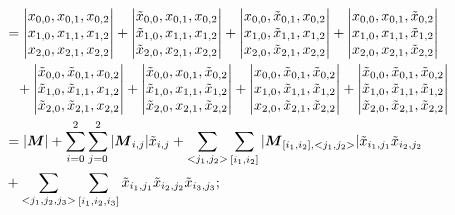 \documentclass[twoside]{article}
\numberwithin{equation}{section}
\newcommand{\eqspace}{\;\;\;}
\begin{document}
\begin{align*}
 &= \left| \begin{matrix} 
        	x_{0,0}, x_{0,1}, x_{0,2} \\ 
			x_{1,0}, x_{1,1}, x_{1,2} \\ 
			x_{2,0}, x_{2,1}, x_{2,2} \end{matrix} \right|
	  + \left| \begin{matrix} 
	  		\tilde{x}_{0,0}, x_{0,1}, x_{0,2} \\ 
			\tilde{x}_{1,0}, x_{1,1}, x_{1,2} \\ 
			\tilde{x}_{2,0}, x_{2,1}, x_{2,2} \end{matrix} \right|	
	  + \left| \begin{matrix} 
	  		x_{0,0}, \tilde{x}_{0,1}, x_{0,2} \\ 
			x_{1,0}, \tilde{x}_{1,1}, x_{1,2} \\ 
			x_{2,0}, \tilde{x}_{2,1}, x_{2,2} \end{matrix} \right|
      + \left| \begin{matrix} 
      		x_{0,0}, x_{0,1}, \tilde{x}_{0,2}  \\
			x_{1,0}, x_{1,1}, \tilde{x}_{1,2} \\ 
			x_{2,0}, x_{2,1}, \tilde{x}_{2,2} \end{matrix} \right| \\
	  &\eqspace + \left| \begin{matrix} 
	  		\tilde{x}_{0,0}, \tilde{x}_{0,1}, x_{0,2} \\ 
			\tilde{x}_{1,0}, \tilde{x}_{1,1}, x_{1,2} \\ 
			\tilde{x}_{2,0}, \tilde{x}_{2,1}, x_{2,2} \end{matrix} \right|
	  + \left| \begin{matrix} 
	  		\tilde{x}_{0,0}, x_{0,1}, \tilde{x}_{0,2}  \\
			\tilde{x}_{1,0}, x_{1,1}, \tilde{x}_{1,2} \\ 
			\tilde{x}_{2,0}, x_{2,1}, \tilde{x}_{2,2} \end{matrix} \right|
	  + \left| \begin{matrix} 
	  		x_{0,0}, \tilde{x}_{0,1}, \tilde{x}_{0,2} \\
			x_{1,0}, \tilde{x}_{1,1}, \tilde{x}_{1,2} \\ 
			x_{2,0}, \tilde{x}_{2,1}, \tilde{x}_{2,2} \end{matrix} \right|
	  + \left| \begin{matrix} 
	  		\tilde{x}_{0,0}, \tilde{x}_{0,1}, \tilde{x}_{0,2} \\
			\tilde{x}_{1,0}, \tilde{x}_{1,1}, \tilde{x}_{1,2} \\ 
			\tilde{x}_{2,0}, \tilde{x}_{2,1}, \tilde{x}_{2,2} \end{matrix} \right| \\
 &= |\M| + \sum_{i = 0}^{2} \sum_{j = 0}^{2} |\M_{i,j}| \tilde{x}_{i,j} 
 		+ \sum_{<j_1,j_2>} \sum_{[i_1,i_2]} |\M_{[i_1,i_2], <j_1,j_2>}| \tilde{x}_{i_1,j_1} \tilde{x}_{i_2,j_2} \\
 &+ \sum_{<j_1,j_2,j_3>} \sum_{[i_1,i_2,i_3]} \tilde{x}_{i_1,j_1} \tilde{x}_{i_2,j_2} \tilde{x}_{i_3,j_3};
\end{align*}
\end{document}
